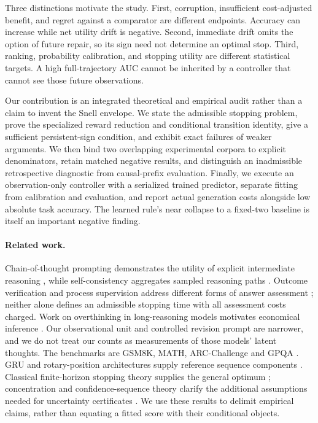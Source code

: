 \documentclass{article}
\begin{document}
Three distinctions motivate the study. First, corruption, insufficient
cost-adjusted benefit, and regret against a comparator are different endpoints.
Accuracy can increase while net utility drift is negative. Second, immediate
drift omits the option of future repair, so its sign need not determine an
optimal stop. Third, ranking, probability calibration, and stopping utility
are different statistical targets. A high full-trajectory AUC cannot be
inherited by a controller that cannot see those future observations.

Our contribution is an integrated theoretical and empirical audit rather than
a claim to invent the Snell envelope. We state the admissible stopping problem,
prove the specialized reward reduction and conditional transition identity,
give a sufficient persistent-sign condition, and exhibit exact failures of
weaker arguments. We then bind two overlapping experimental corpora to
explicit denominators, retain matched negative results, and distinguish an
inadmissible retrospective diagnostic from causal-prefix evaluation. Finally,
we execute an observation-only controller with a serialized trained predictor,
separate fitting from calibration and evaluation, and report actual generation
costs alongside low absolute task accuracy. The learned rule's near collapse to
a fixed-two baseline is itself an important negative finding.

\paragraph{Related work.}
Chain-of-thought prompting demonstrates the utility of explicit intermediate
reasoning \citep{wei2022}, while self-consistency aggregates sampled reasoning
paths \citep{wang2022}. Outcome verification and process supervision address
different forms of answer assessment \citep{cobbe2021,lightman2023}; neither
alone defines an admissible stopping time with all assessment costs charged.
Work on overthinking in long-reasoning models motivates economical
inference \citep{chen2024}. Our observational unit and controlled revision
prompt are narrower, and we do not treat our counts as measurements of those
models' latent thoughts. The benchmarks are GSM8K, MATH, ARC-Challenge and
GPQA \citep{cobbe2021,hendrycks2021,clark2018,rein2023}. GRU and rotary-position
architectures supply reference sequence components \citep{cho2014,su2021}.
Classical finite-horizon stopping theory supplies the general optimum
\citep{ferguson,peskir2006}; concentration and confidence-sequence theory
clarify the additional assumptions needed for uncertainty certificates
\citep{hoeffding1963,howard2021}. We use these results to delimit empirical
claims, rather than equating a fitted score with their conditional objects.
\end{document}
